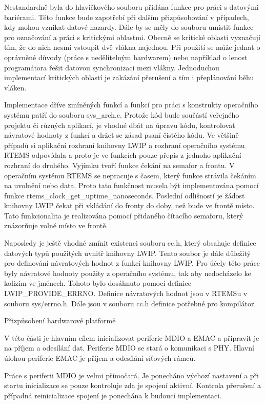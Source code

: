 Nestandardně byla do hlavičkového souboru přidána funkce pro práci s datovými bariérami.
Této funkce bude zapotřebí při dalším přizpůsobování v případech, kdy mohou vznikat datové hazardy.
Dále by se měly do souboru umístit funkce pro označování a práci s kritickými oblastmi.
Obecně se kritické oblasti vyznačují tím, že do nich nesmí vstoupit dvě vlákna najednou.
Při použití se může jednat o oprávněné důvody (práce s nedělitelným hardwarem) nebo například o lenost programátora řešit datovou synchronizaci mezi vlákny.
Jednoduchou implementací kritických oblastí je zakázání přerušení a tím i přeplánování běhu vláken.

Implementace dříve zmíněných funkcí a funkcí pro práci s konstrukty operačního systému patří do souboru sys\_arch.c.
Protože kód bude součástí veřejného projektu či různých aplikací, je vhodné dbát na úpravu kódu, kontrolovat návratové hodnoty z funkcí a držet se zásad psaní čistého kódu.
Ve většině případů si aplikační rozhraní knihovny LWIP a rozhraní operačního systému RTEMS odpovídala a proto je ve funkcích pouze přepis z jednoho aplikační rozhraní do druhého.
Vyjímku tvoří funkce čekání na semafor a frontu.
V operačním systému RTEMS se nepracuje s časem, který funkce strávila čekáním na uvolnění nebo data.
Proto tato funkčnost musela být implementována pomocí funkce rtems\_clock\_get\_uptime\_nanoseconds.
Poslední odlišností je žádost knihovny LWIP čekat při vkládání do fronty do doby, než bude ve frontě místo.
Tato funkcionalita je realizována pomocí přidaného čítacího semaforu, který znázorňuje volné místo ve frontě.

Naposledy je ještě vhodné zmínit existenci souboru cc.h, který obsahuje definice datových typů použitých uvnitř knihovny LWIP.
Tento soubor je dále důležitý pro definování návratových hodnot z funkcí knihovny LWIP.
Pro účely této práce byly návratové hodnoty použity z operačního systému, tak aby nedocházelo ke kolizím ve jménech.
Tohoto bylo dosáhnuto pomocí definice LWIP\_PROVIDE\_ERRNO.
Definice návratových hodnot jsou v RTEMSu v souboru sys/errno.h.
Dále jsou v souboru cc.h definice potřebné pro kompilátor.

\secc Přizpůsobení hardwarové platformě

V této části je hlavním cílem inicializovat periferie MDIO a EMAC a připravit je na příjem a odesílání dat.
Periferie MDIO se stará o komunikaci s PHY.
Hlavní úlohou periferie EMAC je příjem a odesílání síťových rámců. 

Práce s periferii MDIO je velmi přímočará.
Je ponecháno výchozí nastavení a při startu inicializace se pouze kontroluje zda je spojení aktivní.
Kontrola přerušení a případná reinicializace spojení je ponechána k budoucí implementaci.

